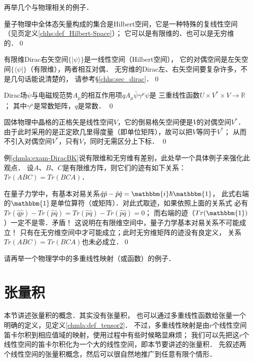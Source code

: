 再举几个与物理相关的例子．

\begin{example}
	量子物理中全体态矢量构成的集合是Hilbert空间，它是一种特殊的复线性空间
	（见\pageref{chhs:def_Hilbert-Space}页定义\ref{chhs:def_Hilbert-Space}）；
	它可以是有限维的、也可以是无穷维的．\qed
\end{example}

\begin{example}\label{chmla:exam-DiracBK}
	有限维Dirac右矢空间$\{|\psi\rangle\}$是一线性空间（Hilbert空间），
	它的对偶空间是左矢空间$\{\langle \psi|\}$（有限维），两者相互对偶．
	无穷维的Dirac左、右矢空间要复杂许多，不是几句话能说清楚的，
	请参考\S \ref{chhs:sec_dirac}．\qed
\end{example}

\begin{example}
    Dirac场$\psi$与电磁规范势$A_\mu$的相互作用项$q A_\mu \bar{\psi}\gamma^\mu \psi$是
    三重线性函数$U\times V^* \times V\to \mathbb{R}$； 其中$\gamma^\mu$是常数矩阵，$q$是常数． \qed
\end{example}

\begin{example}
	固体物理中晶格的正格矢是线性空间$V$，它的倒易格矢空间便是$V$的对偶空间$V^*$．
	由于此时采用的是正定欧几里得度量（即单位矩阵），故可以把$V$等同于$V^*$；
	从而不引入对偶空间$V^*$，只有$V$，同时无需区分上下标． \qed
\end{example}

\begin{example}
	例\ref{chmla:exam-DiracBK}说有限维和无穷维有差别，此处举一个具体例子来强化此观点．
	设$A$、$B$、$C$是有限维方阵，则它们的迹有如下关系：$Tr(ABC)=Tr(BCA)$．
	
	在量子力学中，有基本对易关系$\hat{q}\hat{p}-\hat{p}\hat{q}=\mathbbm{i}\hbar \mathbbm{1}$，
	此式右端的$\mathbbm{1}$是单位算符（或矩阵）．对此式取迹，如果依照上面的关系式
	必有$Tr(\hat{q}\hat{p})-Tr(\hat{p}\hat{q})=Tr(\hat{p}\hat{q})-Tr(\hat{p}\hat{q})=0$；
	而右端的迹（$Tr(\mathbbm{1})$）一定不是零．矛盾！
	这说明在有限维空间中，量子力学基本对易关系不可能成立！
	只有在无穷维空间中才可能成立；此时无穷维矩阵的迹没有良定义，
	关系$Tr(ABC)=Tr(BCA)$也未必成立．\qed
\end{example}


\begin{exercise}
	请再举一个物理学中的多重线性映射（或函数）的例子．
\end{exercise}


\section{张量积}\label{chmla:sec_tensor-product}
本节讲述张量积的概念．其实没有张量积，
也可以通过多重线性函数给张量一个明确的定义，见定义\ref{chmla:def_tensor2}．
不过，多重线性映射是由$r$个线性空间笛卡尔积到相应值域的映射，使用过程中有些时候略显麻烦；
我们可以先把这$r$个线性空间的笛卡尔积化为一个大的线性空间，即本节要讲述的{\kaishu 张量积}．
先叙述两个线性空间的张量积概念，然后可以很自然地推广到任意有限个情形．

